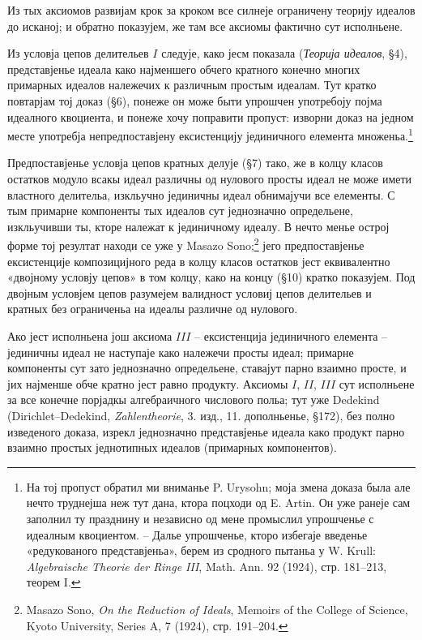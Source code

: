 ﻿\documentclass[11pt]{article}
\begin{document}
Из тых аксиомов развијам крок за кроком все силнеје ограничену теорију идеалов до исканој; и обратно показујем, же там все аксиомы фактично сут исполньене.

Из условја цепов делительев $I$ следује, како јесм показала (\emph{Теорија идеалов}, §4), представјенье идеала како најменшего обчего кратного конечно многих примарных идеалов належечих к различным простым идеалам. Тут кратко повтарјам тој доказ (§6), понеже он може быти упрошчен употребоју појма идеалного квоциента, и понеже хочу поправити пропуст: изворни доказ на једном месте употребја непредпоставјену ексистенцију јединичного елемента множеньа.\footnote{На тој пропуст обратил ми вниманье P. Urysohn; моја змена доказа была але нечто труднејша неж тут дана, ктора поцходи од E. Artin. Он уже ранеје сам заполнил ту празднину и независно од мене промыслил упрошченье с идеалным квоциентом. -- Далье упрошченье, кторо избегаје введенье «редукованого представјеньа», берем из сродного пытаньа у W. Krull: \emph{Algebraische Theorie der Ringe III}, Math. Ann. 92 (1924), стр. 181--213, теорем I.}

Предпоставјенье условја цепов кратных делује (§7) тако, же в колцу класов остатков модуло всакы идеал различны од нулового просты идеал не може имети властного делительа, изкльучно јединичны идеал обнимајучи все елементы. С тым примарне компоненты тых идеалов сут једнозначно определьене, изкльучивши ты, кторе належат к јединичному идеалу. В нечто менье острој форме тој резултат находи се уже у Masazo Sono;\footnote{Masazo Sono, \emph{On the Reduction of Ideals}, Memoirs of the College of Science, Kyoto University, Series A, 7 (1924), стр. 191--204.} јего предпоставјенье ексистенције композицијного реда в колцу класов остатков јест еквивалентно «двојному условју цепов» в том колцу, како на концу (§10) кратко показујем. Под двојным условјем цепов разумејем валидност условиј цепов делительев и кратных без ограниченьа на идеалы различне од нулового.

Ако јест исполньена још аксиома $III$ -- ексистенција јединичного елемента -- јединичны идеал не наступаје како належечи просты идеал; примарне компоненты сут зато једнозначно определьене, ставајут парно взаимно просте, и јих најменше обче кратно јест равно продукту. Аксиомы $I$, $II$, $III$ сут исполньене за все конечне порјадкы алгебраичного числового польа; тут уже Dedekind (Dirichlet--Dedekind, \emph{Zahlentheorie}, 3. изд., 11. дополньенье, §172), без полно изведеного доказа, изрекл једнозначно представјенье идеала како продукт парно взаимно простых једнотипных идеалов (примарных компонентов).
\end{document}
